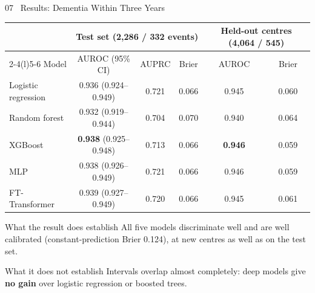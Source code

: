 \documentclass[aspectratio=169,11pt]{beamer}
\begin{document}
\begin{frame}{07 \textbar\ Results: Dementia Within Three Years}
\small
\begin{tabular}{@{}lccccc@{}}
\toprule
 & \multicolumn{3}{c}{Test set (2,286 / 332 events)} & \multicolumn{2}{c}{Held-out centres (4,064 / 545)} \\
\cmidrule(lr){2-4}\cmidrule(l){5-6}
Model & AUROC (95\% CI) & AUPRC & Brier & AUROC & Brier \\
\midrule
Logistic regression & 0.936 (0.924--0.949) & 0.721 & 0.066 & 0.945 & 0.060 \\
Random forest & 0.932 (0.919--0.944) & 0.704 & 0.070 & 0.940 & 0.064 \\
XGBoost & \textbf{0.938} (0.925--0.948) & 0.713 & 0.066 & \textbf{0.946} & 0.059 \\
MLP & 0.938 (0.926--0.949) & 0.721 & 0.066 & 0.946 & 0.059 \\
FT-Transformer & 0.939 (0.927--0.949) & 0.720 & 0.066 & 0.945 & 0.061 \\
\bottomrule
\end{tabular}
\begin{block}{What the result does establish}
All five models discriminate well and are well calibrated (constant-prediction Brier 0.124), at new centres as well as on the test set.
\end{block}
\begin{block}{What it does not establish}
Intervals overlap almost completely: deep models give \textbf{no gain} over logistic regression or boosted trees.
\end{block}
\end{frame}
\end{document}
